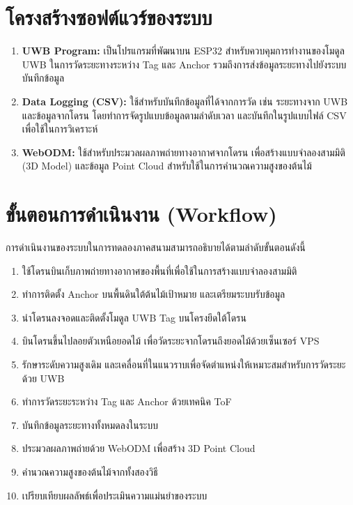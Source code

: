 \section{โครงสร้างซอฟต์แวร์ของระบบ}
\begin{enumerate}
    \item \textbf{UWB Program:} เป็นโปรแกรมที่พัฒนาบน ESP32 สำหรับควบคุมการทำงานของโมดูล UWB ในการวัดระยะทางระหว่าง Tag และ Anchor รวมถึงการส่งข้อมูลระยะทางไปยังระบบบันทึกข้อมูล
    \item \textbf{Data Logging (CSV):} ใช้สำหรับบันทึกข้อมูลที่ได้จากการวัด เช่น ระยะทางจาก UWB และข้อมูลจากโดรน โดยทำการจัดรูปแบบข้อมูลตามลำดับเวลา และบันทึกในรูปแบบไฟล์ CSV เพื่อใช้ในการวิเคราะห์
    \item \textbf{WebODM:} ใช้สำหรับประมวลผลภาพถ่ายทางอากาศจากโดรน เพื่อสร้างแบบจำลองสามมิติ (3D Model) และข้อมูล Point Cloud สำหรับใช้ในการคำนวณความสูงของต้นไม้
\end{enumerate}

\section{ขั้นตอนการดำเนินงาน (Workflow)}

การดำเนินงานของระบบในการทดลองภาคสนามสามารถอธิบายได้ตามลำดับขั้นตอนดังนี้

\begin{enumerate}
    \item ใช้โดรนบินเก็บภาพถ่ายทางอากาศของพื้นที่เพื่อใช้ในการสร้างแบบจำลองสามมิติ
    \item ทำการติดตั้ง Anchor บนพื้นดินใต้ต้นไม้เป้าหมาย และเตรียมระบบรับข้อมูล
    \item นำโดรนลงจอดและติดตั้งโมดูล UWB Tag บนโครงยึดใต้โดรน
    \item บินโดรนขึ้นไปลอยตัวเหนือยอดไม้ เพื่อวัดระยะจากโดรนถึงยอดไม้ด้วยเซ็นเซอร์ VPS
    \item รักษาระดับความสูงเดิม และเคลื่อนที่ในแนวราบเพื่อจัดตำแหน่งให้เหมาะสมสำหรับการวัดระยะด้วย UWB
    \item ทำการวัดระยะระหว่าง Tag และ Anchor ด้วยเทคนิค ToF
    \item บันทึกข้อมูลระยะทางทั้งหมดลงในระบบ
    \item ประมวลผลภาพถ่ายด้วย WebODM เพื่อสร้าง 3D Point Cloud
    \item คำนวณความสูงของต้นไม้จากทั้งสองวิธี
    \item เปรียบเทียบผลลัพธ์เพื่อประเมินความแม่นยำของระบบ
\end{enumerate}

